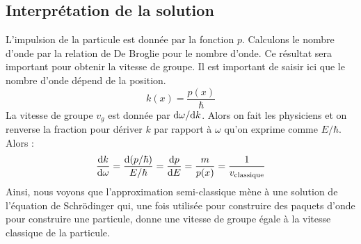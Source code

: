 \documentclass[12pt, a4paper]{book}
\begin{document}
\subsection{Interprétation de la solution}
L'impulsion de la particule est donnée par la fonction $p$. Calculons le nombre d'onde par la relation de De Broglie pour le nombre d'onde. Ce résultat sera important pour obtenir la vitesse de groupe. Il est important de saisir ici que le nombre d'onde dépend de la position.
$$k(x) = \dfrac{p(x)}{\hbar}$$
La vitesse de groupe $v_g$ est donnée par $\mathrm{d}\omega/\mathrm{d} k$. Alors on fait les physiciens et on renverse la fraction pour dériver $k$ par rapport à $\omega$ qu'on exprime comme $E/\hbar$. Alors :
$$\dfrac{\mathrm{d} k}{\mathrm{d} \omega} = \dfrac{\mathrm{d} (p/\hbar)}{E/\hbar} = \dfrac{\mathrm{d} p }{\mathrm{d} E} = \dfrac{m}{p(x)}=  \dfrac{1}{v_{\text{classique}}}$$
Ainsi, nous voyons que l'approximation semi-classique mène à une solution de l'équation de Schrödinger qui, une fois utilisée pour construire des paquets d'onde pour construire une particule, donne une vitesse de groupe égale à la vitesse classique de la particule.
\end{document}
